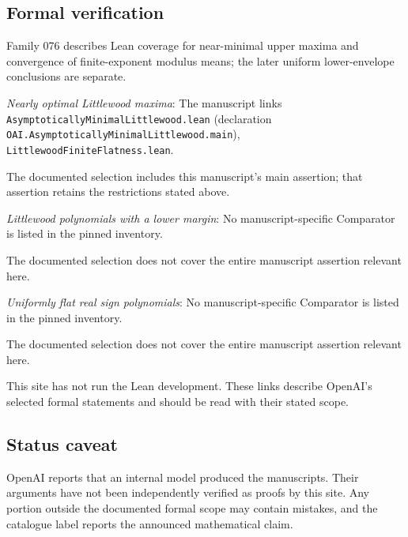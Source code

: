 \documentclass[11pt]{article}
\begin{document}
\subsection{Formal verification}
Family 076 describes Lean coverage for near-minimal upper maxima and convergence of finite-exponent modulus means; the later uniform lower-envelope conclusions are separate.

\textit{Nearly optimal Littlewood maxima}: The manuscript links \texttt{AsymptoticallyMinimalLittlewood.lean} (declaration \texttt{OAI.AsymptoticallyMinimalLittlewood.main}), \texttt{LittlewoodFiniteFlatness.lean}.

The documented selection includes this manuscript’s main assertion; that assertion retains the restrictions stated above.

\textit{Littlewood polynomials with a lower margin}: No manuscript-specific Comparator is listed in the pinned inventory.

The documented selection does not cover the entire manuscript assertion relevant here.

\textit{Uniformly flat real sign polynomials}: No manuscript-specific Comparator is listed in the pinned inventory.

The documented selection does not cover the entire manuscript assertion relevant here.

This site has not run the Lean development. These links describe OpenAI’s selected formal statements and should be read with their stated scope.

\subsection{Status caveat}
OpenAI reports that an internal model produced the manuscripts. Their arguments have not been independently verified as proofs by this site. Any portion outside the documented formal scope may contain mistakes, and the catalogue label reports the announced mathematical claim.
\end{document}
